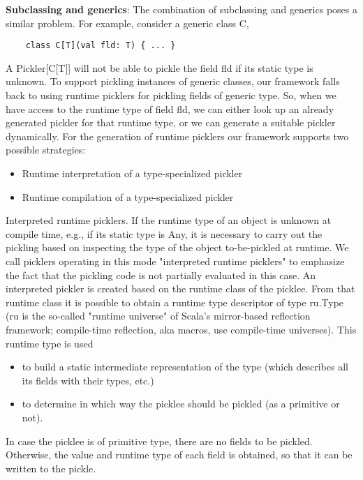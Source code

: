 \documentclass[preprint,10pt]{sigplanconf}
\begin{document}
{\bf Subclassing and generics}: The combination of subclassing and generics poses a similar problem. For example, consider a generic class C,

\begin{verbatim}
    class C[T](val fld: T) { ... }
\end{verbatim}

A Pickler[C[T]] will not be able to pickle the field fld if its static type is unknown. To support pickling instances of generic classes, our framework falls back to using runtime picklers for pickling fields of generic type. So, when we have access to the runtime type of field fld, we can either look up an already generated pickler for that runtime type, or we can generate a suitable pickler dynamically. For the generation of runtime picklers our framework supports two possible strategies:

\begin{itemize}
\item Runtime interpretation of a type-specialized pickler
\item Runtime compilation of a type-specialized pickler
\end{itemize}

Interpreted runtime picklers. If the runtime type of an object is unknown at compile time, e.g., if its static type is Any, it is necessary to carry out the pickling based on inspecting the type of the object to-be-pickled at runtime. We call picklers operating in this mode "interpreted runtime picklers" to emphasize the fact that the pickling code is not partially evaluated in this case. An interpreted pickler is created based on the runtime class of the picklee. From that runtime class it is possible to obtain a runtime type descriptor of type ru.Type (ru is the so-called "runtime universe" of Scala's mirror-based reflection framework; compile-time reflection, aka macros, use compile-time universes). This runtime type is used

\begin{itemize}
\item to build a static intermediate representation of the type (which describes all its fields with their types, etc.)
\item to determine in which way the picklee should be pickled (as a primitive or not).
\end{itemize}

In case the picklee is of primitive type, there are no fields to be pickled. Otherwise, the value and runtime type of each field is obtained, so that it can be written to the pickle.
\end{document}
